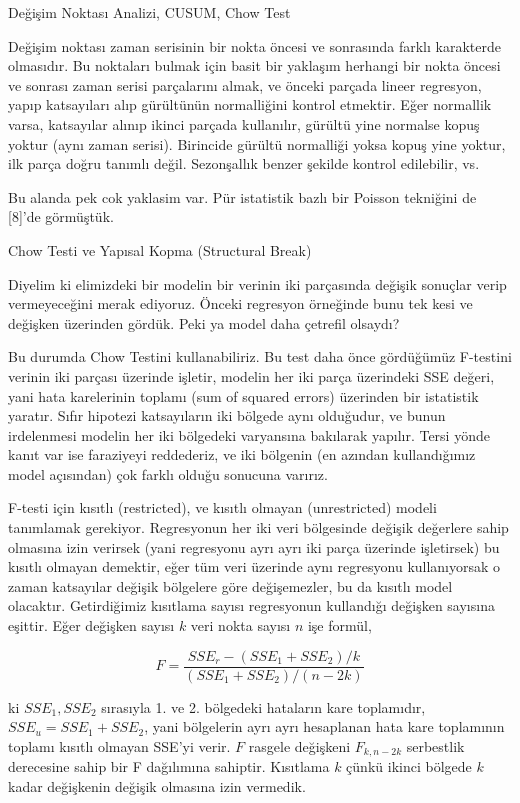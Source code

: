 \documentclass[12pt,fleqn]{article}\usepackage{../../common}
\begin{document}
Değişim Noktası Analizi, CUSUM, Chow Test

Değişim noktası zaman serisinin bir nokta öncesi ve sonrasında farklı karakterde
olmasıdır. Bu noktaları bulmak için basit bir yaklaşım herhangi bir nokta öncesi
ve sonrası zaman serisi parçalarını almak, ve önceki parçada lineer regresyon,
yapıp katsayıları alıp gürültünün normalliğini kontrol etmektir. Eğer normallik
varsa, katsayılar alınıp ikinci parçada kullanılır, gürültü yine normalse kopuş
yoktur (aynı zaman serisi). Birincide gürültü normalliği yoksa kopuş yine
yoktur, ilk parça doğru tanımlı değil. Sezonşallık benzer şekilde kontrol
edilebilir, vs.

Bu alanda pek cok yaklasim var. Pür istatistik bazlı bir Poisson tekniğini de
[8]'de görmüştük.

Chow Testi ve Yapısal Kopma (Structural Break)

Diyelim ki elimizdeki bir modelin bir verinin iki parçasında değişik
sonuçlar verip vermeyeceğini merak ediyoruz. Önceki regresyon örneğinde
bunu tek kesi ve değişken üzerinden gördük. Peki ya model daha çetrefil
olsaydı?

Bu durumda Chow Testini kullanabiliriz. Bu test daha önce gördüğümüz
F-testini verinin iki parçası üzerinde işletir, modelin her iki parça
üzerindeki SSE değeri, yani hata karelerinin toplamı (sum of squared
errors) üzerinden bir istatistik yaratır. Sıfır hipotezi katsayıların iki
bölgede aynı olduğudur, ve bunun irdelenmesi modelin her iki bölgedeki
varyansına bakılarak yapılır. Tersi yönde kanıt var ise faraziyeyi
reddederiz, ve iki bölgenin (en azından kullandığımız model açısından) çok
farklı olduğu sonucuna varırız.

F-testi için kısıtlı (restricted), ve kısıtlı olmayan (unrestricted) modeli
tanımlamak gerekiyor. Regresyonun her iki veri bölgesinde değişik değerlere
sahip olmasına izin verirsek (yani regresyonu ayrı ayrı iki parça üzerinde
işletirsek) bu kısıtlı olmayan demektir, eğer tüm veri üzerinde aynı
regresyonu kullanıyorsak o zaman katsayılar değişik bölgelere göre
değişemezler, bu da kısıtlı model olacaktır. Getirdiğimiz kısıtlama sayısı
regresyonun kullandığı değişken sayısına eşittir. Eğer değişken sayısı $k$
veri nokta sayısı $n$ işe formül,

$$ 
F = \frac{SSE_r - (SSE_1 + SSE_2) / k}{(SSE_1 + SSE_2) / (n-2k)}
 $$

ki $SSE_1,SSE_2$ sırasıyla 1. ve 2. bölgedeki hataların kare toplamıdır, $SSE_u
= SSE_1 + SSE_2$, yani bölgelerin ayrı ayrı hesaplanan hata kare toplamının
toplamı kısıtlı olmayan SSE'yi verir. $F$ rasgele değişkeni $F_{k,n-2k}$
serbestlik derecesine sahip bir F dağılımına sahiptir. Kısıtlama $k$ çünkü
ikinci bölgede $k$ kadar değişkenin değişik olmasına izin vermedik.
\end{document}

